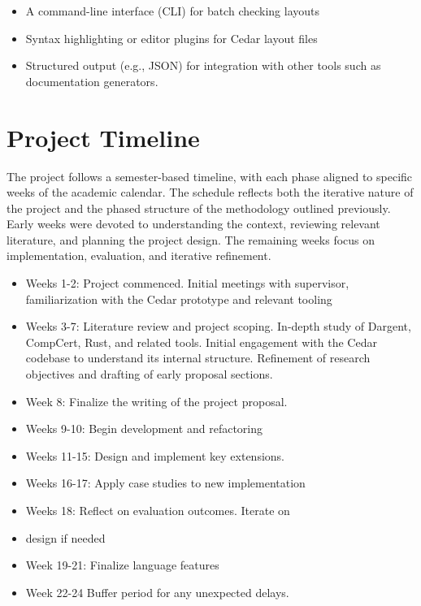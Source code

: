 \documentclass[12pt]{article}
\begin{document}
\begin{itemize}
    \item A command-line interface (CLI) for batch checking layouts
    \item Syntax highlighting or editor plugins for Cedar layout files
    \item Structured output (e.g., JSON) for integration with other tools
    such as documentation generators.
\end{itemize}

\section{Project Timeline}
The project follows a semester-based timeline, with each phase aligned
to specific weeks of the academic calendar. The schedule reflects both
the iterative nature of the project and the phased structure of the methodology
outlined previously. Early weeks were devoted to understanding the 
context, reviewing relevant literature, and planning the project design.
The remaining weeks focus on implementation, evaluation, and iterative refinement.

\begin{itemize}

\item    Weeks 1-2: Project commenced. Initial meetings with supervisor, familiarization with
the Cedar prototype and relevant tooling
\item    Weeks 3-7: Literature review and project scoping. In-depth study of Dargent, CompCert,
Rust, and related tools. Initial engagement with the Cedar codebase to understand
its internal structure. Refinement of research objectives and drafting of early
proposal sections.
\item Week 8: Finalize the writing of the project proposal.
\item    Weeks 9-10: Begin development and refactoring
\item Weeks 11-15: Design and implement key extensions.
\item Weeks 16-17: Apply case studies to new implementation
\item    Weeks 18: Reflect on evaluation outcomes. Iterate on
\item design if needed
\item Week 19-21: Finalize language features
\item Week 22-24 Buffer period for any unexpected delays.
\end{itemize}
\end{document}
